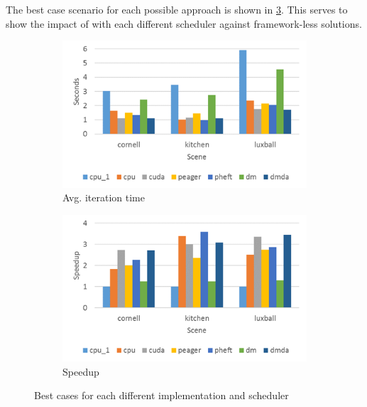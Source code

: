 \documentclass[main.tex]{subfiles}
\begin{document}
The best case scenario for each possible approach is shown in \cref{fig:prof:overall}. This serves to show the impact of \starpu with each different scheduler against framework-less solutions.

\begin{figure}[!htp]
  \centering
  \begin{subfigure}{.5\textwidth}
    \centering
    \includegraphics[width=\linewidth]{profiling/1iter_time}
    \caption{Avg. iteration time \label{fig:prof:overall_time}}
  \end{subfigure}%
  \begin{subfigure}{.5\textwidth}
    \centering
    \includegraphics[width=\linewidth]{profiling/1iter_speedup}
    \caption{Speedup \label{fig:prof:overall_speedup}}
  \end{subfigure}
  \caption{Best cases for each different implementation and scheduler \label{fig:prof:overall}}
\end{figure}
\end{document}
